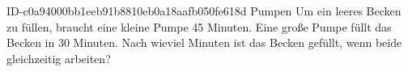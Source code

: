 \begin{exercise}
      {ID-c0a94000bb1eeb91b8810eb0a18aafb050fe618d}
      {Pumpen}
  \ifproblem\problem
    Um ein leeres Becken zu füllen, braucht eine kleine Pumpe 45 Minuten.
    Eine große Pumpe füllt das Becken in 30 Minuten. Nach wieviel Minuten
    ist das Becken gefüllt, wenn beide gleichzeitig arbeiten?
  \fi
\end{exercise}
